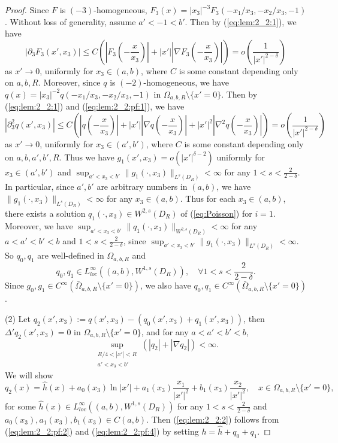 \documentclass[10pt,a4paper]{amsart}
\begin{document}
\begin{proof}
	Since $F$ is $(-3)$-homogeneous, $F_3(x)=|x_3|^{-3}F_3(-x_1/x_3, -x_2/x_3, -1)$. Without loss of generality, assume $a'<-1<b'$. 
	Then by (\ref{eq:lem:2_2:1}), we have
	\[
		|\partial_3F_3(x', x_3)|
		\le C(|F_3(-\frac{x}{x_3})|+ |x'| |\nabla F_3(-\frac{x}{x_3})|)=o\left(\frac{1}{|x'|^{2-\delta}}\right) 
	\]
	as $x'\to 0$, uniformly for $x_3\in (a, b)$, 
	where $C$ is some constant depending only on $a, b, R$. 
Moreover, since $q$ is $(-2)$-homogeneous, we have $q(x)=|x_3|^{-2}q(-x_1/x_3, -x_2/x_3, -1)$ in $\Omega_{a, b, R}\setminus\{x'=0\}$. 
	Then by (\ref{eq:lem:2_2:1}) and (\ref{eq:lem:2_2:pf:1}), we have
	\[
		|\partial_3^2q(x', x_3)|
		\le C(|q(-\frac{x}{x_3})|+|x'| |\nabla q(-\frac{x}{x_3})|+|x'|^2|\nabla^2 q(-\frac{x}{x_3})|)=o\left(\frac{1}{|x'|^{2-\delta}}\right)
			\]
	as $x'\to 0$, uniformly for $x_3\in (a', b')$, where $C$ is some constant depending only on $a, b, a', b', R$. 
	Thus we have $g_1(x', x_3)=o\left(|x'|^{\delta-2}\right)$ uniformly for $x_3\in (a', b')$ and 	 $\sup_{a'<x_3<b'}\|g_1(\cdot, x_3)\|_{L^s(D_R)}<\infty$ for any $1< s<\frac{2}{2-\delta}$. 
	In particular, since $a', b'$ are arbitrary numbers in $(a,b)$, we have $\|g_1(\cdot, x_3)\|_{L^s(D_R)}<\infty$ for any $x_3\in (a, b)$. Thus for each $x_3\in (a, b)$, there exists a solution $q_1(\cdot,x_3)\in W^{2,s}(D_R)$ of (\ref{eq:Poisson}) for $i=1$. Moreover, we have $\sup_{a'<x_3<b'} \| q_1(\cdot, x_3) \|_{W^{2,s}(D_{R})} < \infty$ for any $a<a'<b'<b$ and $1< s<\frac{2}{2-\delta}$, since $\sup_{a'<x_3<b'}\|g_1(\cdot, x_3)\|_{L^s(D_R)}<\infty$. So $q_0, q_1$ are well-defined in $\Omega_{a, b, R}$ and 
	\begin{equation}\label{eq:lem:2_2:pf:2}
		q_0, q_1 \in L^{\infty}_{loc}((a, b), W^{1, s}(D_R)), \quad \forall 1<s<\frac{2}{2-\delta}.
	\end{equation} 
	Since $g_0, g_1\in C^{\infty}(\bar{\Omega}_{a, b, R}\setminus\{x'=0\})$, we also have 
	$q_0, q_1\in C^{\infty}(\bar{\Omega}_{a, b, R}\setminus\{x'=0\})$. 	

	(2) Let $q_2(x',x_3):=q(x',x_3)-(q_0(x', x_3)+q_1(x', x_3))$, then $\Delta' q_2(x', x_3)=0$ in $\Omega_{a, b, R}\setminus\{x'=0\}$, and for any $a<a'<b'<b$, 
	\begin{equation}\label{eq:lem:2_2:pf:3}
		\sup\limits_{\substack{R/4<|x'|<R \\ a'<x_3<b'}}(|q_2|+|\nabla q_2|)<\infty. 
	\end{equation}
	We will show 
	\begin{equation}\label{eq:lem:2_2:pf:4}
		q_2(x)=\hat{h}(x)+a_0(x_3)\ln |x'|+a_1(x_3)\frac{x_1}{|x'|^2}+b_1(x_3)\frac{x_2}{|x'|^2}, \quad x\in \Omega_{a, b, R}\setminus\{x'=0\},
	\end{equation}
	for some $\hat{h}(x) \in L^{\infty}_{loc}((a, b), W^{1, s}(D_R))$ for any $1< s<\frac{2}{2-\delta}$ and $a_0(x_3), a_1(x_3), b_1(x_3)\in C(a, b)$. Then (\ref{eq:lem:2_2:2}) follows from (\ref{eq:lem:2_2:pf:2}) and (\ref{eq:lem:2_2:pf:4}) by setting $h=\hat{h}+q_0+q_1$. 
	

\end{proof}
\end{document}
